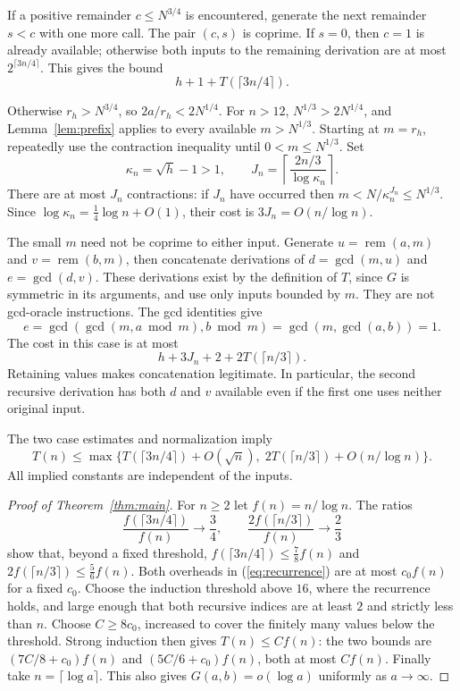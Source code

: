 \documentclass[11pt]{article}
\newcommand{\rem}{\operatorname{rem}}
\begin{document}
If a positive remainder $c\leq N^{3/4}$ is encountered, generate the next
remainder $s<c$ with one more call. The pair $(c,s)$ is coprime. If $s=0$, then
$c=1$ is already available; otherwise both inputs to the remaining derivation
are at most $2^{\lceil3n/4\rceil}$. This gives the bound
\begin{equation}\label{eq:early}
h+1+T(\lceil3n/4\rceil).
\end{equation}

Otherwise $r_h>N^{3/4}$, so $2a/r_h<2N^{1/4}$. For $n>12$,
$N^{1/3}>2N^{1/4}$, and Lemma~\ref{lem:prefix} applies to every available
$m>N^{1/3}$. Starting at $m=r_h$, repeatedly use the contraction inequality until
$0<m\leq N^{1/3}$. Set
\[
\kappa_n=\sqrt h-1>1,\qquad
J_n=\left\lceil\frac{2n/3}{\log\kappa_n}\right\rceil.
\]
There are at most $J_n$ contractions: if $J_n$ have occurred then
$m<N/\kappa_n^{J_n}\leq N^{1/3}$. Since
$\log\kappa_n=\tfrac14\log n+O(1)$, their cost is $3J_n=O(n/\log n)$.

The small $m$ need not be coprime to either input. Generate
$u=\rem(a,m)$ and $v=\rem(b,m)$, then concatenate derivations of
$d=\gcd(m,u)$ and $e=\gcd(d,v)$. These derivations exist by the definition of
$T$, since $G$ is symmetric in its arguments, and use only inputs bounded by $m$.
They are not gcd-oracle instructions.
The gcd identities give
\[
e=\gcd(\gcd(m,a\bmod m),b\bmod m)
 =\gcd(m,\gcd(a,b))=1.
\]
The cost in this case is at most
\begin{equation}\label{eq:late}
h+3J_n+2+2T(\lceil n/3\rceil).
\end{equation}
Retaining values makes concatenation legitimate. In particular, the second
recursive derivation has both $d$ and $v$ available even if the first one uses
neither original input.

The two case estimates and normalization imply
\begin{equation}\label{eq:recurrence}
T(n)\leq\max\{T(\lceil3n/4\rceil)+O(\sqrt n),\;
2T(\lceil n/3\rceil)+O(n/\log n)\}.
\end{equation}
All implied constants are independent of the inputs.

\begin{proof}[Proof of Theorem~\ref{thm:main}]
For $n\geq2$ let $f(n)=n/\log n$. The ratios
\[
\frac{f(\lceil3n/4\rceil)}{f(n)}\longrightarrow\frac34,
\qquad
\frac{2f(\lceil n/3\rceil)}{f(n)}\longrightarrow\frac23
\]
show that, beyond a fixed threshold, $f(\lceil3n/4\rceil)\leq\tfrac78f(n)$ and
$2f(\lceil n/3\rceil)\leq\tfrac56f(n)$. Both overheads in
(\ref{eq:recurrence}) are at most $c_0f(n)$ for a fixed $c_0$. Choose the
induction threshold above $16$, where the recurrence holds, and large enough
that both recursive indices are at least $2$ and strictly less than $n$. Choose
$C\geq8c_0$, increased to cover the finitely many values below the threshold.
Strong induction then gives $T(n)\leq Cf(n)$: the two bounds are
$(7C/8+c_0)f(n)$ and $(5C/6+c_0)f(n)$, both at most $Cf(n)$.
Finally take $n=\lceil\log a\rceil$. This also gives $G(a,b)=o(\log a)$
uniformly as $a\to\infty$.
\end{proof}
\end{document}
